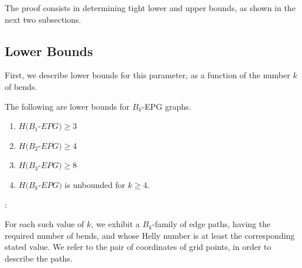 The proof consists in determining tight lower and upper bounds, as shown in the next two subsections. 

\subsection{Lower Bounds}

First, we describe lower bounds for this parameter,  as a function of the number $k$ of bends.

\begin{lema}\label{claim:lower-Bk-EPG} 
The following are lower bounds for $B_k$-EPG graphs.
\begin{enumerate}[nosep,label=\emph{(\roman*)}]
\item   $H(B_1$-$EPG) \geq 3$ 
\item $H(B_2$-$EPG) \geq 4$ 
\item $H(B_3$-$EPG) \geq 8$ 
\item $H(B_k$-$EPG )$ is unbounded for $k \geq 4$.
\end{enumerate}
\end{lema}

\proof:

For each such value of $k$, we exhibit a $B_k$-family of edge paths, having the required number of bends, and whose Helly number is at least the corresponding stated value. We refer to the pair of coordinates of grid points, in order to describe the paths.

